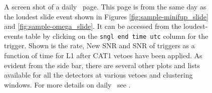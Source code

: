 \begin{figure}[p]
\label{fig:sample-daily_ihope-slide}
\center
{}
\caption{A screen shot of a daily \ihope~page. This page is from the same day
as the loudest slide event shown in Figures \ref{fig:sample-minifup_slide} and
\ref{fig:sample-omega_slide}. It can be accessed from the loudest-events table
by clicking on the \texttt{sngl end time utc} column for the trigger. Shown is the
rate, New SNR and SNR of triggers as a function of time for L1 after
CAT1 vetoes have been applied. As evident from the side bar, there are several
other plots and lists available for all the detectors at various vetoes and
clustering windows. For more details on daily \ihope~see \cite{Pekowsky:thesis}.}
\end{figure}

